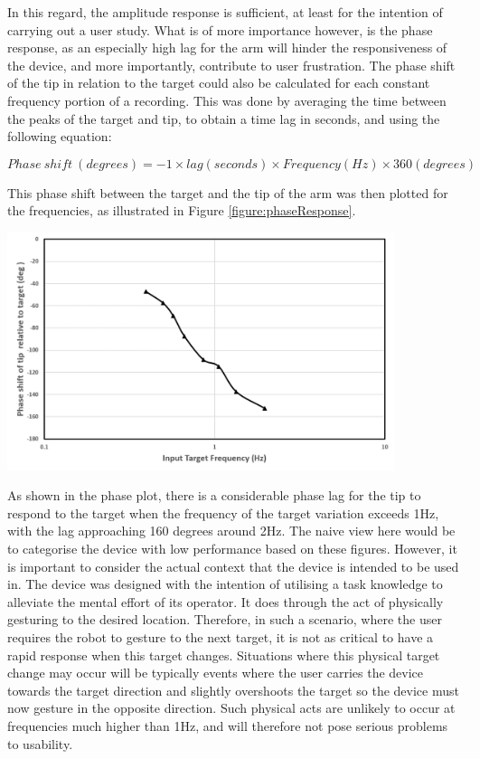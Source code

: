 \documentclass[11pt]{article}
\begin{document}
In this regard, the amplitude response is sufficient, at least for the intention of carrying out a user study. What is of more importance however, is the phase response, as an especially high lag for the arm will hinder the responsiveness of the device, and more importantly, contribute to user frustration. The phase shift of the tip in relation to the target could also be calculated for each constant frequency portion of a recording. This was done by averaging the time between the peaks of the target and tip, to obtain a time lag in seconds, and using the following equation:

\begin{equation}\label{equation:phaseShift}
Phase \ shift \ (degrees) = -1 \times lag(seconds)\times Frequency(Hz)\times 360(degrees)
\end{equation}

This phase shift between the target and the tip of the arm was then plotted for the frequencies, as illustrated in Figure \ref{figure:phaseResponse}.

\begin{center}
\includegraphics[width=0.85\textwidth]{images/phaseResponse2.png}
\label{figure:phaseResponse}
\end{center}

As shown in the phase plot, there is a considerable phase lag for the tip to respond to the target when the frequency of the target variation exceeds 1Hz, with the lag approaching 160 degrees around 2Hz. The naive view here would be to categorise the device with low performance based on these figures. However, it is important to consider the actual context that the device is intended to be used in. The device was designed with the intention of utilising a task knowledge to alleviate the mental effort of its operator. It does through the act of physically gesturing to the desired location. Therefore, in such a scenario, where the user requires the robot to gesture to the next target, it is not as critical to have a rapid response when this target changes. Situations where this physical target change may occur will be typically events where the user carries the device towards the target direction and slightly overshoots the target so the device must now gesture in the opposite direction. Such physical acts are unlikely to occur at frequencies much higher than 1Hz, and will therefore not pose serious problems to usability. 
\end{document}
